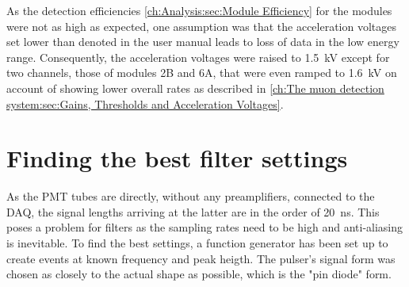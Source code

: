   As the detection efficiencies \ref{ch:Analysis:sec:Module Efficiency} for the modules were not as high as expected, one assumption was that the acceleration voltages set lower than denoted in the user manual leads to loss of data in the low energy range. Consequently, the acceleration voltages were raised to \SI{1.5}{\kilo\volt} except for two channels, those of modules 2B and 6A, that were even ramped to \SI{1.6}{\kilo\volt} on account of showing lower overall rates as described in \ref{ch:The muon detection system:sec:Gains, Thresholds and Acceleration Voltages}. 
  
  \section{Finding the best filter settings}
  \label{ch:Analysis:sec:Finding the best filter settings}
  As the PMT tubes are directly, without any preamplifiers, connected to the DAQ, the signal lengths arriving at the latter are in the order of \SI{20}{\nano\second}. This poses a problem for filters as the sampling rates need to be high and anti-aliasing is inevitable. To find the best settings, a function generator has been set up to create events at known frequency and peak heigth. The pulser's signal form  was chosen as closely to the actual shape as possible, which is the "pin diode" form.
 
